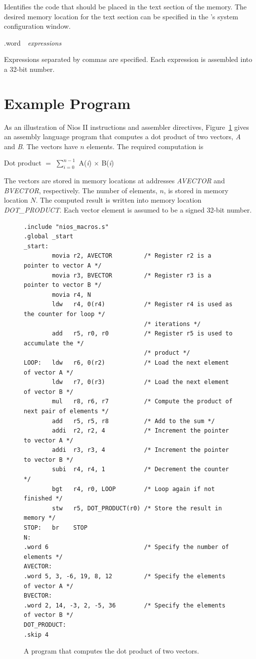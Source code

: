 \documentclass[11pt, twoside, pdftex]{article}
\begin{document}
\noindent
Identifies the code that should be placed in the text section of the memory.
The desired memory location for the text section can be specified in the 
\productNameMed{}'s system configuration window.
 

\noindent
{\sf .word}~~{\it expressions}
 

\noindent
Expressions separated by commas are specified. Each expression is assembled into
a 32-bit number.
 
 

\section{Example Program}

As an illustration of Nios II instructions and assembler directives, 
Figure~\ref{fig:6} gives an assembly language program
that computes a dot product of two vectors, {\it A} and {\it B}. The vectors
have $n$ elements. The required computation is
\begin{center}
Dot product $=$ $\sum_{i = 0}^{n - 1}$ A({\it i}) $\times$ B({\it i})
\end{center}

\noindent
The vectors are stored in memory locations at addresses
{\it AVECTOR} and {\it BVECTOR}, respectively. The number of
elements, $n$, is stored in memory location $N$. The computed result is written
into memory location {\it DOT\_PRODUCT}. Each vector element is assumed to be a
signed 32-bit number.

\begin{figure}[H]
\begin{lstlisting}[style=defaultNiosStyle]
.include "nios_macros.s"
.global _start
_start:
        movia r2, AVECTOR         /* Register r2 is a pointer to vector A */
        movia r3, BVECTOR         /* Register r3 is a pointer to vector B */
        movia r4, N
        ldw   r4, 0(r4)           /* Register r4 is used as the counter for loop */
                                  /* iterations */
        add   r5, r0, r0          /* Register r5 is used to accumulate the */
                                  /* product */
LOOP:   ldw   r6, 0(r2)           /* Load the next element of vector A */
        ldw   r7, 0(r3)           /* Load the next element of vector B */
        mul   r8, r6, r7          /* Compute the product of next pair of elements */
        add   r5, r5, r8          /* Add to the sum */
        addi  r2, r2, 4           /* Increment the pointer to vector A */
        addi  r3, r3, 4           /* Increment the pointer to vector B */
        subi  r4, r4, 1           /* Decrement the counter */
        bgt   r4, r0, LOOP        /* Loop again if not finished */
        stw   r5, DOT_PRODUCT(r0) /* Store the result in memory */
STOP:   br    STOP
N:
.word 6                           /* Specify the number of elements */
AVECTOR:
.word 5, 3, -6, 19, 8, 12         /* Specify the elements of vector A */
BVECTOR:
.word 2, 14, -3, 2, -5, 36        /* Specify the elements of vector B */
DOT_PRODUCT:
.skip 4
\end{lstlisting}
	\caption{A program that computes the dot product of two vectors.}
	\label{fig:6}
\end{figure}
 
\end{document}
